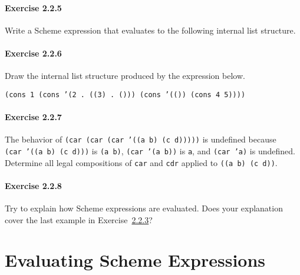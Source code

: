 \paragraph{Exercise \label{start_g11}2.2.5}


\label{start_s38}Write a Scheme expression that evaluates to the following internal
list structure.


\begin{figure}[H]
\centering

\end{figure}





\paragraph{Exercise \label{start_g12}2.2.6}


\label{start_s39}Draw the internal list structure produced by the expression below.


\texttt{(cons 1 (cons '(2 . ((3) . ())) (cons '(()) (cons 4 5))))}



\paragraph{Exercise \label{start_g13}2.2.7}


\label{start_s40}The behavior of
\texttt{(car (car (car '((a b) (c d)))))} is undefined because
\texttt{(car '((a b) (c d)))} is \texttt{(a b)},
\texttt{(car '(a b))} is \texttt{a},
and \texttt{(car 'a)} is undefined.
Determine all legal compositions of \texttt{car} and \texttt{cdr} applied
to \texttt{((a b) (c d))}.





\paragraph{Exercise \label{start_g14}2.2.8}


\label{start_s41}Try to explain how Scheme expressions are evaluated.
Does your explanation cover the last example in Exercise \hyperref[start_g9]{2.2.3}?




\section{\label{start_g15}\label{start_h3}Evaluating Scheme Expressions\label{start_SECTGSEVALUATING}}



